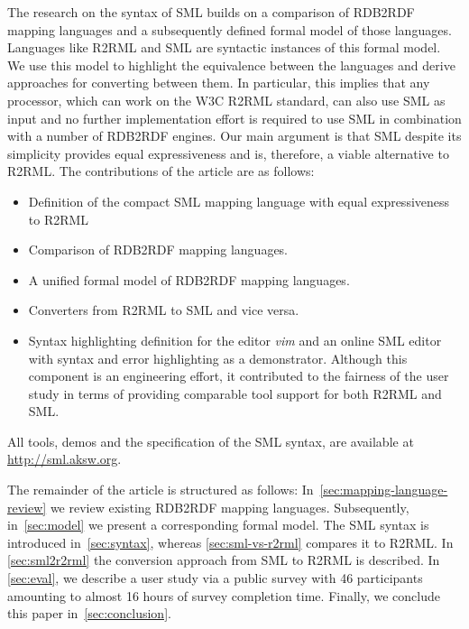 The research on the syntax of SML builds on a comparison of RDB2RDF mapping languages and a subsequently defined formal model of those languages.
Languages like R2RML and SML are syntactic instances of this formal model.
We use this model to highlight the equivalence between the languages and derive approaches for converting between them.
In particular, this implies that any processor, which can work on the W3C R2RML standard, can also use SML as input and no further implementation effort is required to use SML in combination with a number of RDB2RDF engines.
Our main argument is that SML despite its simplicity provides equal expressiveness and is, therefore, a viable alternative to R2RML.
The contributions of the article are as follows:
\begin{itemize}
 \item Definition of the compact SML mapping language with equal expressiveness to R2RML
 \item Comparison of RDB2RDF mapping languages.
 \item A unified formal model of RDB2RDF mapping languages.
 \item Converters from R2RML to SML and vice versa.
 \item Syntax highlighting definition for the editor \emph{vim} and an online
 SML editor with syntax and error highlighting as a demonstrator.
 Although this component is an engineering effort, it contributed to
 the fairness of the user study in terms of providing comparable tool support
 for both R2RML and SML.
\end{itemize}

All tools, demos and the specification of the SML syntax, are available at \url{http://sml.aksw.org}.

The remainder of the article is structured as follows:
In~\autoref{sec:mapping-language-review} we review existing RDB2RDF mapping
languages. Subsequently, in~\autoref{sec:model} we present a corresponding
formal model. The SML syntax is introduced in~\autoref{sec:syntax},
whereas \autoref{sec:sml-vs-r2rml} compares it to R2RML.
In \autoref{sec:sml2r2rml} the conversion approach from SML to R2RML is described.
In \autoref{sec:eval}, we describe a user study via a public survey with 46 participants amounting to almost 16 hours of survey completion time.
Finally, we conclude this paper in~\autoref{sec:conclusion}.

